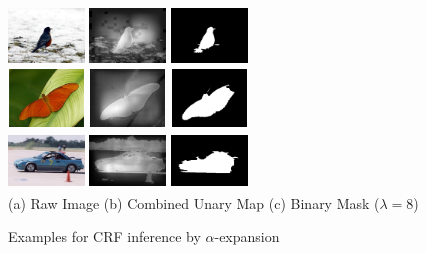 \documentclass[10pt,twocolumn,letterpaper]{article}
\begin{document}
\begin{figure}[t]
\begin{center}
    \includegraphics[width=0.8in,height=0.6in]{./Figures/CRFinference/5_159_159364.jpg}
    \includegraphics[width=0.8in,height=0.6in]{./Figures/CRFinference/5_159_159364_3.jpg}
    \includegraphics[width=0.8in,height=0.6in]{./Figures/CRFinference/5_159_159364_2.jpg} \\
    \includegraphics[width=0.8in,height=0.6in]{./Figures/CRFinference/5_159_159649.jpg}
    \includegraphics[width=0.8in,height=0.6in]{./Figures/CRFinference/5_159_159649_3.jpg}
    \includegraphics[width=0.8in,height=0.6in]{./Figures/CRFinference/5_159_159649_2.jpg} \\
    \includegraphics[width=0.8in,height=0.6in]{./Figures/CRFinference/5_162_162349.jpg}
    \includegraphics[width=0.8in,height=0.6in]{./Figures/CRFinference/5_162_162349_3.jpg}
    \includegraphics[width=0.8in,height=0.6in]{./Figures/CRFinference/5_162_162349_2.jpg} \\
    \footnotesize  (a) Raw Image (b) Combined Unary Map  (c) Binary Mask ($\lambda=8$)\\
     \caption{Examples for CRF inference by $\alpha$-expansion}
\end{center}
\end{figure}
\end{document}
